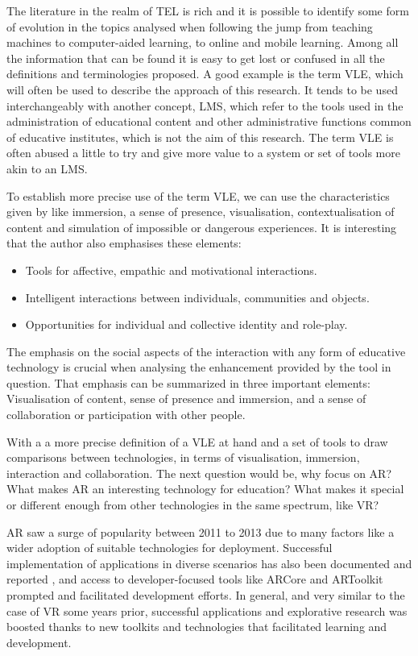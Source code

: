 The literature in the realm of \ac{TEL} is rich and it is possible to identify some form of evolution in the topics analysed when following the jump from teaching machines \parencite{watters_2021} to computer-aided learning, to online and mobile learning. Among all the information that can be found it is easy to get
lost or confused in all the definitions and terminologies proposed. A good example is the term \ac{VLE}, which will often be used to describe the approach of this research. It tends to be used interchangeably with another concept, \ac{LMS}, which refer to the tools used in the administration of educational content
and other administrative functions common of educative institutes, which is not the aim of this research. The term \ac{VLE} is often abused a little to try and give more value to a system or set of tools more akin to an \ac{LMS}.

To establish more precise use of the term \ac{VLE}, we can use the characteristics given by \textcite{warburton_2009} like immersion, a sense of presence, visualisation, contextualisation of content and simulation of impossible or dangerous experiences. It is interesting that the author also emphasises these elements:

\begin{itemize}
    \item Tools for affective, empathic and motivational interactions.
    \item Intelligent interactions between individuals, communities and objects.
    \item Opportunities for individual and collective identity and role-play.
\end{itemize}

The emphasis on the social aspects of the interaction with any form of educative technology is crucial when analysing the enhancement provided by the tool in question. That emphasis can be summarized in three important elements: Visualisation of content, sense of presence and immersion, and a sense of collaboration or
participation with other people.

With a a more precise definition of a \ac{VLE} at hand and a set of tools to draw comparisons between technologies, in terms of visualisation, immersion, interaction and collaboration. The next question would be, why focus on \ac{AR}? What makes \ac{AR} an interesting technology for education? What makes it special or
different enough from other technologies in the same spectrum, like \ac{VR}?

\ac{AR} saw a surge of popularity between 2011 to 2013 \parencite{akcayir_2017,fidan_2019} due to many factors like a wider adoption of suitable technologies for deployment. Successful implementation of applications in diverse scenarios has also been documented and reported \parencite{javornik_2016}, and access to
developer-focused tools like ARCore and ARToolkit prompted and facilitated development efforts. In general, and very similar to the case of \ac{VR} some years prior, successful applications and explorative research was boosted thanks to new toolkits and technologies that facilitated learning and development.

